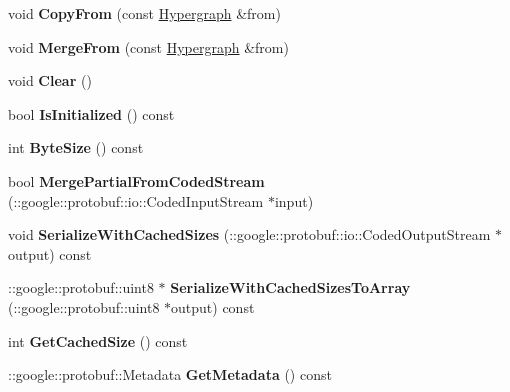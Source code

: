 \begin{DoxyCompactItemize}
\item 
\hypertarget{classHypergraph_a4715ac922c373c335985c25f9766a526}{
void {\bfseries CopyFrom} (const \hyperlink{classHypergraph}{Hypergraph} \&from)}
\label{classHypergraph_a4715ac922c373c335985c25f9766a526}

\item 
\hypertarget{classHypergraph_a5e48c533c90271a6e018a26ac8a70538}{
void {\bfseries MergeFrom} (const \hyperlink{classHypergraph}{Hypergraph} \&from)}
\label{classHypergraph_a5e48c533c90271a6e018a26ac8a70538}

\item 
\hypertarget{classHypergraph_a3377b5de90d222621cc41c2c41b7865d}{
void {\bfseries Clear} ()}
\label{classHypergraph_a3377b5de90d222621cc41c2c41b7865d}

\item 
\hypertarget{classHypergraph_a5327b9372e5dd8dd4e435b160e5f16df}{
bool {\bfseries IsInitialized} () const }
\label{classHypergraph_a5327b9372e5dd8dd4e435b160e5f16df}

\item 
\hypertarget{classHypergraph_ab4aa8a83cd1da71a9f31bdad594ffaf0}{
int {\bfseries ByteSize} () const }
\label{classHypergraph_ab4aa8a83cd1da71a9f31bdad594ffaf0}

\item 
\hypertarget{classHypergraph_a30583bfba242ae1439903bc24d069e24}{
bool {\bfseries MergePartialFromCodedStream} (::google::protobuf::io::CodedInputStream $\ast$input)}
\label{classHypergraph_a30583bfba242ae1439903bc24d069e24}

\item 
\hypertarget{classHypergraph_a7e8e7f4fe037cbfeb1f0a46e7616fc78}{
void {\bfseries SerializeWithCachedSizes} (::google::protobuf::io::CodedOutputStream $\ast$output) const }
\label{classHypergraph_a7e8e7f4fe037cbfeb1f0a46e7616fc78}

\item 
\hypertarget{classHypergraph_a86e069313a6ce786d6578d4fa416dd39}{
::google::protobuf::uint8 $\ast$ {\bfseries SerializeWithCachedSizesToArray} (::google::protobuf::uint8 $\ast$output) const }
\label{classHypergraph_a86e069313a6ce786d6578d4fa416dd39}

\item 
\hypertarget{classHypergraph_a34d579551c68eb5e039062269f875522}{
int {\bfseries GetCachedSize} () const }
\label{classHypergraph_a34d579551c68eb5e039062269f875522}

\item 
\hypertarget{classHypergraph_af2886402d4f2114b650696ce2e53f860}{
::google::protobuf::Metadata {\bfseries GetMetadata} () const }
\label{classHypergraph_af2886402d4f2114b650696ce2e53f860}


\end{DoxyCompactItemize}
